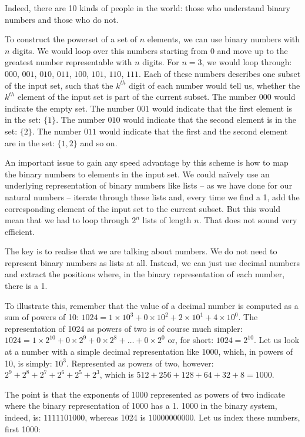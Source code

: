 \documentclass{scrreprt}
\begin{document}
Indeed, there are 10 kinds of people in the world:
those who understand binary numbers
and those who do not.

To construct the powerset of a set of $n$ elements,
we can use binary numbers with $n$ digits.
We would loop over this numbers starting from 0
and move up to the greatest number representable
with $n$ digits. For $n = 3$, we would loop through:
$000$, $001$, $010$, $011$, $100$, $101$, $110$, $111$.
Each of these numbers describes one subset of the input set,
such that the $k^{th}$ digit of each number would tell us,
whether the $k^{th}$ element of the input set
is part of the current subset.
The number $000$ would indicate the empty set.
The number $001$ would indicate 
that the first element is in the set: $\lbrace 1\rbrace$.
The number $010$ would indicate
that the second element is in the set: $\lbrace 2\rbrace$.
The number $011$ would indicate
that the first and the second element 
are in the set: $\lbrace 1,2\rbrace$
and so on.

An important issue to gain any speed advantage
by this scheme is how to map the binary numbers
to elements in the input set.
We could na\"ively use an underlying representation
of binary numbers like lists -- 
as we have done for our natural numbers --
iterate through these lists and,
every time we find a 1,
add the corresponding element of the input set
to the current subset.
But this would mean that we had to loop
through $2^n$ lists of length $n$.
That does not sound very efficient.

The key is to realise
that we are talking about numbers.
We do not need to represent binary numbers
as lists at all.
Instead, we can just use decimal numbers
and extract the positions
where, in the binary representation of each number,
there is a 1. 

To illustrate this,
remember that the value of a decimal number
is computed as a sum of powers of 10:
$1024 = 1 \times 10^3 + 0 \times 10^2 + 2 \times 10^1 + 4 \times 10^0$.
The representation of \num{1024} as powers of two
is of course much simpler: 
$1024 = 1 \times 2^{10} + 
        0 \times 2^9 + 0 \times 2^8 + \dots + 0 \times 2^0$
or, for short:
$1024 = 2^{10}$.
Let us look at a number
with a simple decimal representation like \num{1000},
which, in powers of 10, is simply:
$10^3$. Represented as powers of two, however:
$2^9 + 2^8 + 2^7 + 2^6 + 2^5 + 2^3$,
which is 
$512 + 256 + 128 + 64 + 32 + 8 = 1000$.

The point is that the exponents
of \num{1000} represented as powers of two
indicate where the binary representation of \num{1000}
has a 1. \num{1000} in the binary system, indeed, is:
$1111101000$, whereas \num{1024} is
$10000000000$.
Let us index these numbers, first \num{1000}:
\end{document}

